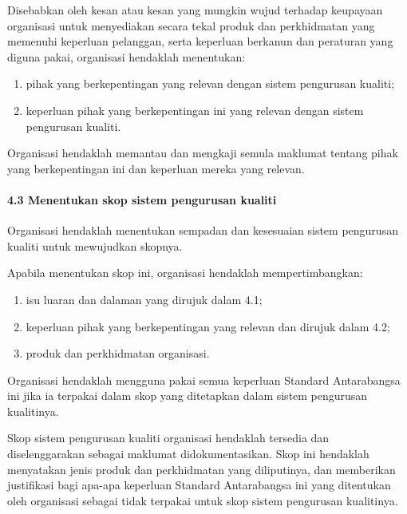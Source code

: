 \documentclass[
]{article}
\begin{document}
Disebabkan oleh kesan atau kesan yang mungkin wujud terhadap keupayaan
organisasi untuk menyediakan secara tekal produk dan perkhidmatan yang
memenuhi keperluan pelanggan, serta keperluan berkanun dan peraturan
yang diguna pakai, organisasi hendaklah menentukan:

\begin{enumerate}
\def\labelenumi{\alph{enumi})}
\item
  pihak yang berkepentingan yang relevan dengan sistem pengurusan
  kualiti;
\item
  keperluan pihak yang berkepentingan ini yang relevan dengan sistem
  pengurusan kualiti.
\end{enumerate}

Organisasi hendaklah memantau dan mengkaji semula maklumat tentang pihak
yang berkepentingan ini dan keperluan mereka yang relevan.

\hypertarget{menentukan-skop-sistem-pengurusan-kualiti}{%
\paragraph{4.3 Menentukan skop sistem pengurusan
kualiti}\label{menentukan-skop-sistem-pengurusan-kualiti}}

Organisasi hendaklah menentukan sempadan dan kesesuaian sistem
pengurusan kualiti untuk mewujudkan skopnya.

Apabila menentukan skop ini, organisasi hendaklah mempertimbangkan:

\begin{enumerate}
\def\labelenumi{\alph{enumi})}
\item
  isu luaran dan dalaman yang dirujuk dalam 4.1;
\item
  keperluan pihak yang berkepentingan yang relevan dan dirujuk dalam
  4.2;
\item
  produk dan perkhidmatan organisasi.
\end{enumerate}

Organisasi hendaklah mengguna pakai semua keperluan Standard
Antarabangsa ini jika ia terpakai dalam skop yang ditetapkan dalam
sistem pengurusan kualitinya.

Skop sistem pengurusan kualiti organisasi hendaklah tersedia dan
diselenggarakan sebagai maklumat didokumentasikan. Skop ini hendaklah
menyatakan jenis produk dan perkhidmatan yang diliputinya, dan
memberikan justifikasi bagi apa-apa keperluan Standard Antarabangsa ini
yang ditentukan oleh organisasi sebagai tidak terpakai untuk skop sistem
pengurusan kualitinya.
\end{document}
